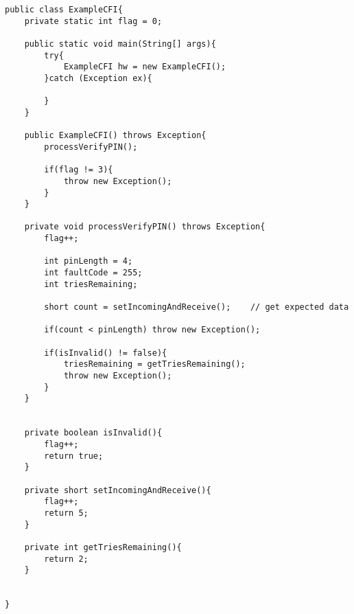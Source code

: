 \begin{lstlisting}[caption={Java code example of the control flow integrity countermeasure},label={lst:examplecfi}]
public class ExampleCFI{
    private static int flag = 0;
	
    public static void main(String[] args){
        try{
            ExampleCFI hw = new ExampleCFI();
        }catch (Exception ex){

        }
    }

    public ExampleCFI() throws Exception{
        processVerifyPIN();
		
        if(flag != 3){
            throw new Exception();
        }
    }

    private void processVerifyPIN() throws Exception{
        flag++;
		
        int pinLength = 4;
        int faultCode = 255;
        int triesRemaining;

        short count = setIncomingAndReceive();    // get expected data
		
        if(count < pinLength) throw new Exception();

        if(isInvalid() != false){
            triesRemaining = getTriesRemaining();
            throw new Exception();
        }
    }


    private boolean isInvalid(){
        flag++;
        return true;
    }

    private short setIncomingAndReceive(){
        flag++;
        return 5;
    }

    private int getTriesRemaining(){
        return 2;
    }


}
\end{lstlisting}